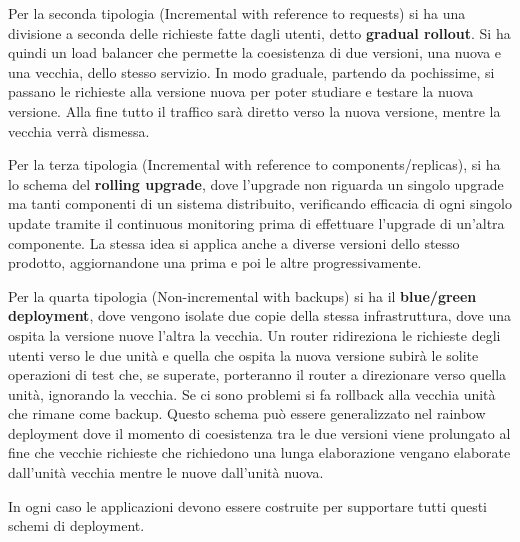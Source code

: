 Per la seconda tipologia (Incremental with reference to requests) si ha una
divisione a seconda delle richieste fatte dagli utenti, detto \textbf{gradual rollout}.
Si ha quindi un load balancer che permette la coesistenza di due versioni, una
nuova e una vecchia, dello stesso servizio. In modo graduale, partendo da pochissime,
si passano le richieste alla versione nuova per poter studiare e testare la nuova
versione. Alla fine tutto il traffico sarà diretto verso la nuova versione, mentre
la vecchia verrà dismessa.

Per la terza tipologia (Incremental with reference to components/replicas),
si ha lo schema del \textbf{rolling upgrade}, dove l'upgrade non riguarda un
singolo upgrade ma tanti componenti di un sistema distribuito, verificando efficacia
di ogni singolo update tramite il continuous monitoring prima di effettuare l'upgrade
di un'altra componente. La stessa idea si applica anche a diverse versioni dello
stesso prodotto, aggiornandone una prima e poi le altre progressivamente.

Per la quarta tipologia (Non-incremental with backups) si ha il
\textbf{blue/green deployment}, dove vengono isolate due copie della stessa
infrastruttura, dove una ospita la versione nuove l'altra la vecchia. Un router
ridireziona le richieste degli utenti verso le due unità e quella che ospita la
nuova versione subirà le solite operazioni di test che, se superate, porteranno
il router a direzionare verso quella unità, ignorando la vecchia. Se ci sono problemi
si fa rollback alla vecchia unità che rimane come backup. Questo schema può essere
generalizzato nel rainbow deployment dove il momento di coesistenza tra le due
versioni viene prolungato al fine che vecchie richieste che richiedono una lunga
elaborazione vengano elaborate dall'unità vecchia mentre le nuove dall'unità nuova.

In ogni caso le applicazioni devono essere costruite per supportare tutti questi
schemi di deployment.
